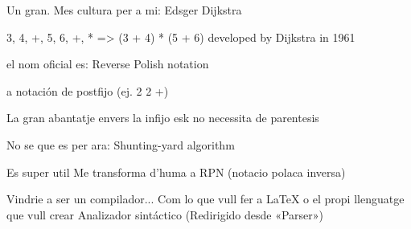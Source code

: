 

Un gran. Mes cultura per a mi:
	Edsger Dijkstra



3, 4, +, 5, 6, +, * => (3 + 4) * (5 + 6)
developed by Dijkstra in 1961

el nom oficial es:
Reverse Polish notation

a notación de postfijo (ej. 2 2 +)

La gran abantatje envers la infijo esk no necessita de parentesis



No se que es per ara:
Shunting-yard algorithm

Es super util
Me transforma d'huma a RPN (notacio polaca inversa)



Vindrie a ser un compilador... Com lo que vull fer a LaTeX o el propi llenguatge que vull crear
Analizador sintáctico
(Redirigido desde «Parser»)
